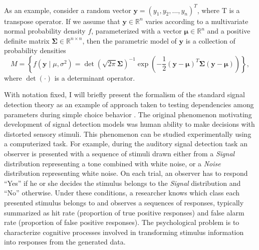 \documentclass[12pt]{report}
\begin{document}
As an example, consider a random vector $\mathbf{y} = (y_1, y_2, \ldots, y_n)^T$, where T is a transpose operator. If we assume that $\mathbf{y} \in \mathbb{R}^n$ varies according to a multivariate normal probability density $f$, parameterized with a vector $\boldsymbol{\mu} \in \mathbb{R}^n$ and a positive definite matrix $\boldsymbol{\Sigma} \in \mathbb{R}^{n\times n}$, then the parametric model of $\mathbf{y}$ is a collection of probability densities  
\begin{equation}
M = \left\{f(\mathbf{y} \mid \mu, \sigma^2) = \det(\sqrt{2\pi}\boldsymbol{\Sigma})^{-1} \exp\left(-\frac{1}{2}(\mathbf{y} - \boldsymbol{\mu})^T\boldsymbol{\Sigma}(\mathbf{y}-\boldsymbol{\mu})\right)\right\}, 
\end{equation}
where $\det(\cdot)$ is a determinant operator.

With notation fixed, I will briefly present the formalism of the standard signal detection theory as an example of approach taken to testing dependencies among parameters during simple choice behavior \citep{MacCre2004}. The original phenomenon motivating development
of signal detection models was human ability to make decisions with
distorted sensory stimuli. This phenomenon can be studied experimentally
using a computerized task. For example, during the auditory signal
detection task an observer is presented with a sequence of stimuli drawn
either from a \textit{Signal} distribution representing a tone combined with
white noise, or a \textit{Noise} distribution representing white noise. On each
trial, an observer has to respond ``Yes'' if he or she decides the
stimulus belongs to the \textit{Signal} distribution and ``No'' otherwise. Under
these conditions, a researcher knows which class each presented stimulus
belongs to and observes a sequences of responses, typically summarized as
hit rate (proportion of true positive responses) and false alarm
rate (proportion of false positive responses). The psychological problem is to
characterize cognitive processes involved in transforming stimulus
information into responses from the generated data.
\end{document}
